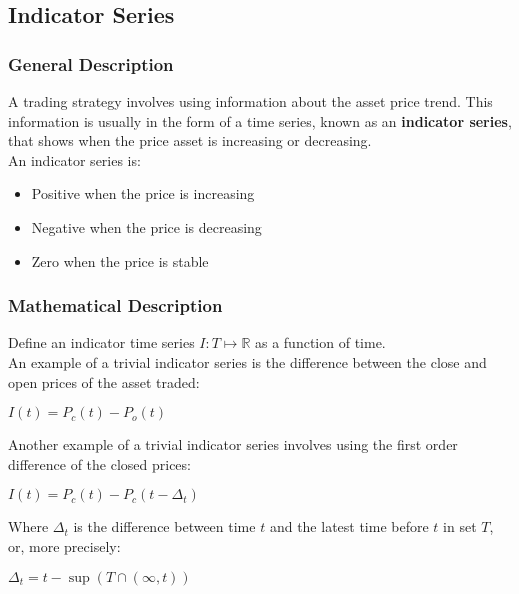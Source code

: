 \documentclass[11pt]{article}
\begin{document}
\subsection{Indicator Series}

\subsubsection{General Description}

A trading strategy involves using information about the asset price trend. 
\nolinebreak
This information is usually in the form of a time series, known as an \textbf{indicator series}, that shows when the price asset is increasing or decreasing.\\

An indicator series is:
\begin{itemize}
    \item Positive when the price is increasing
    \item Negative when the price is decreasing
    \item Zero when the price is stable
\end{itemize}

\subsubsection{Mathematical Description}


Define an indicator time series $I:T \mapsto \mathbb{R}$ as a function of time.\\

An example of a trivial indicator series is the difference between the close and open prices of the asset traded:
\begin{center}
    $I(t) = P_c(t) - P_o(t)$
\end{center}

Another example of a trivial indicator series involves using the first order difference of the closed prices:
\begin{center}
    $I(t) = P_c(t) - P_c(t - \Delta_t)$
\end{center}

Where $\Delta_t$ is the difference between time $t$ and the latest time before $t$ in set $T$, or, more precisely: 
\begin{center}
    $\Delta_t = t - \sup \left ( T \cap (\infty, t) \right )$
\end{center}
\end{document}
